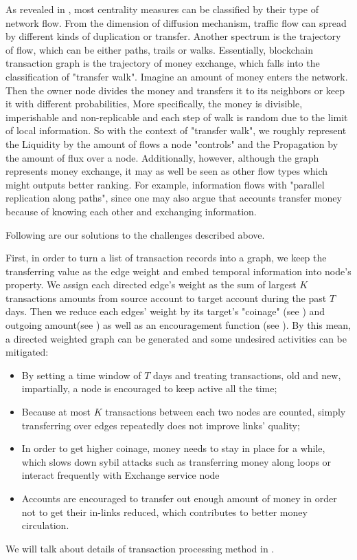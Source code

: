 As revealed in \cite{Borgatti2005}, most centrality measures can be classified by their type of network flow. From the dimension of diffusion mechanism, traffic flow can spread by different kinds of duplication or transfer. Another spectrum is the trajectory of flow, which can be either paths, trails or walks. Essentially, blockchain transaction graph is the trajectory of money exchange, which falls into the classification of "transfer walk". Imagine an amount of money enters the network. Then the owner node divides the money and transfers it to its neighbors or keep it with different probabilities, More specifically, the money is divisible, imperishable and non-replicable and each step of walk is random due to the limit of local information. So with the context of "transfer walk", we roughly represent the Liquidity by the amount of flows a node "controls" and the Propagation by the amount of flux over a node. Additionally, however, although the graph represents money exchange, it may as well be seen as other flow types which might outputs better ranking. For example, information flows with "parallel replication along paths", since one may also argue that accounts transfer money because of knowing each other and exchanging information.

Following are our solutions to the challenges described above.

First, in order to turn a list of transaction records into a graph, we keep the transferring value as the edge weight and embed temporal information into node's property. We assign each directed edge's weight as the sum of largest $K$ transactions amounts from source account to target account during the past $T$ days. Then we reduce each edges' weight by its target's "coinage" (see ) and outgoing amount(see ) as well as an encouragement function (see ). By this mean, a directed weighted graph can be generated and some undesired activities can be mitigated: 
\begin{itemize}
	\item By setting a time window of $T$ days and treating transactions, old and new, impartially, a node is encouraged to keep active all the time;
	\item Because at most $K$ transactions between each two nodes are counted, simply transferring over edges repeatedly does not improve links' quality;
	\item In order to get higher coinage, money needs to stay in place for a while, which slows down sybil attacks such as transferring money along loops or interact frequently with Exchange service node
	\item Accounts are encouraged to transfer out enough amount of money in order not to get their in-links reduced, which contributes to better money circulation.
\end{itemize}
We will talk about details of transaction processing method in . 

